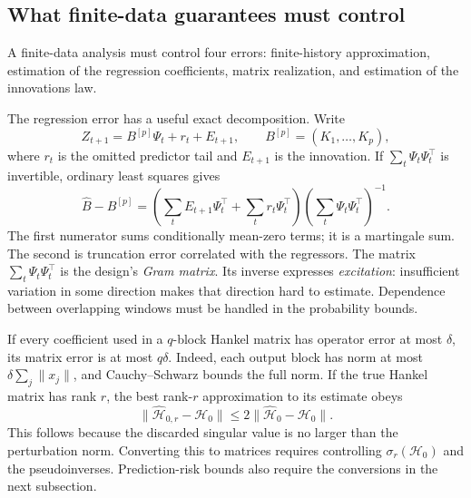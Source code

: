 \documentclass[11pt,twoside]{article}
\theoremstyle{definition}
\theoremstyle{remark}
\begin{document}
\subsection{What finite-data guarantees must control}
\label{sec:finite-guarantees}

A finite-data analysis must control four errors:
finite-history approximation, estimation of the regression coefficients,
matrix realization, and estimation of the innovations law.

The regression error has a useful exact decomposition. Write
\[
 Z_{t+1}=B^{[p]}\Psi_t+r_t+E_{t+1},\qquad
 B^{[p]}=(K_1,\ldots,K_p),
\]
where \(r_t\) is the omitted predictor tail and \(E_{t+1}\) is the
innovation. If \(\sum_t\Psi_t\Psi_t^\top\) is invertible, ordinary least
squares gives
\begin{equation}
 \widehat B-B^{[p]}
 =\left(\sum_tE_{t+1}\Psi_t^\top+
         \sum_tr_t\Psi_t^\top\right)
       \left(\sum_t\Psi_t\Psi_t^\top\right)^{-1}.
 \label{eq:regression-decomposition}
\end{equation}
The first numerator sums conditionally mean-zero terms; it is a
martingale sum. The second is truncation error correlated with the
regressors. The matrix \(\sum_t\Psi_t\Psi_t^\top\) is the design's
\emph{Gram matrix}. Its inverse expresses
\emph{excitation}: insufficient variation in some direction makes that
direction hard to estimate. Dependence between overlapping windows must
be handled in the probability bounds.

If every coefficient used in a \(q\)-block Hankel matrix has operator
error at most \(\delta\), its matrix error is at most \(q\delta\).
Indeed, each output block has norm at most
\(\delta\sum_j\|x_j\|\), and Cauchy--Schwarz bounds the full norm.
If the true Hankel matrix has rank \(r\), the best rank-\(r\)
approximation to its estimate obeys
\begin{equation}
 \|\widehat{\mathcal H}_{0,r}-\mathcal H_0\|
 \le2\|\widehat{\mathcal H}_0-\mathcal H_0\|.
 \label{eq:rank-truncation}
\end{equation}
This follows because the discarded singular value is no larger than
the perturbation norm. Converting this to matrices requires controlling
\(\sigma_r(\mathcal H_0)\) and the pseudoinverses.
Prediction-risk bounds also require the conversions in the next subsection.
\end{document}
